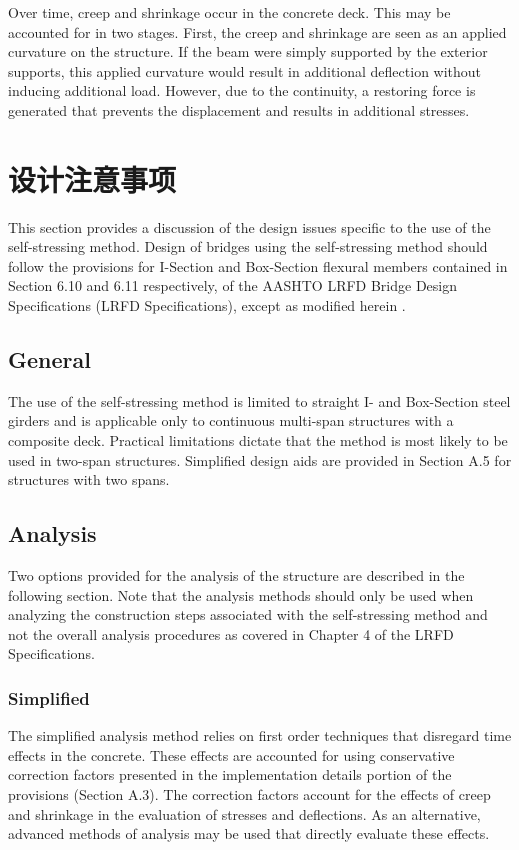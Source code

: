 Over time, creep and shrinkage occur in the concrete deck. This may be accounted for in two stages. First, the creep and shrinkage are seen as an applied curvature on the structure. If the beam were simply supported by the exterior supports, this applied curvature would result in additional deflection without inducing additional load. However, due to the continuity, a restoring force is generated that prevents the displacement and results in additional stresses.

\section{设计注意事项}
This section provides a discussion of the design issues specific to the use of the self-stressing method. Design of bridges using the self-stressing method should follow the provisions for I-Section and Box-Section flexural members contained in Section 6.10 and 6.11 respectively, of the AASHTO LRFD Bridge Design Specifications (LRFD Specifications), except as modified herein \cite{aashto2012l}.

\subsection{General}
The use of the self-stressing method is limited to straight I- and Box-Section steel girders and is applicable only to continuous multi-span structures with a composite deck. Practical limitations dictate that the method is most likely to be used in two-span structures. Simplified design aids are provided in Section A.5 for structures with two spans.

\subsection{Analysis}
Two options provided for the analysis of the structure are described in the following section. Note that the analysis methods should only be used when analyzing the construction steps associated with the self-stressing method and not the overall analysis procedures as covered in Chapter 4 of the LRFD Specifications.

\subsubsection{Simplified}
The simplified analysis method relies on first order techniques that disregard time effects in the concrete. These effects are accounted for using conservative correction factors presented in the implementation details portion of the provisions (Section A.3). The correction factors account for the effects of creep and shrinkage in the evaluation of stresses and deflections. As an alternative, advanced methods of analysis may be used that directly evaluate these effects.


